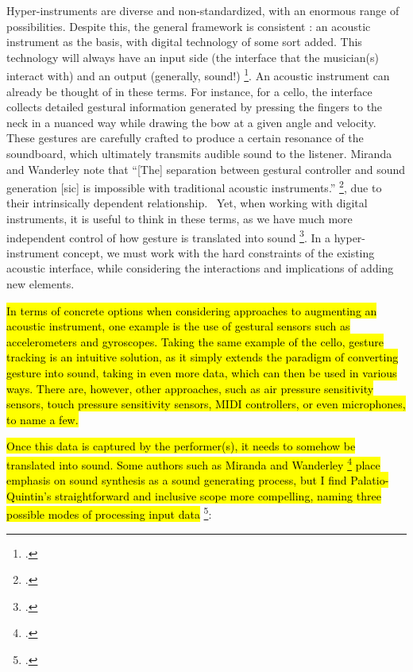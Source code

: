 \documentclass[12pt,twoside,maitrise]{dms_ks}
\theoremstyle{definition}
\begin{document}
Hyper-instruments are diverse and non-standardized, with an enormous range of possibilities.  
Despite this, the general framework is consistent : an acoustic instrument as the basis, with digital technology of some sort added. 
This technology will always have an input side (the interface that the musician(s) interact with) and an output (generally, sound!) \footcite[3]{miranda_new_2006}. 
An acoustic instrument can already be thought of in these terms.
For instance, for a cello, the interface collects detailed gestural information generated by pressing the fingers to the neck in a nuanced way while drawing the bow at a given angle and velocity. 
These gestures are carefully crafted to produce a certain resonance of the soundboard, which ultimately transmits audible sound to the listener. 
Miranda and Wanderley note that “[The] separation between gestural controller and sound generation [sic] is impossible with traditional acoustic instruments.” \footcite[3]{miranda_new_2006}, due to their intrinsically dependent relationship.~
Yet, when working with digital instruments, it is useful to think in these terms, as we have much more independent control of how gesture is translated into sound \footcite[24--25]{jorda_digital_2005}.
In a hyper-instrument concept, we must work with the hard constraints of the existing acoustic interface, while considering the interactions and implications of adding new elements. 

\hl{In terms of concrete options when considering approaches to augmenting an acoustic instrument, one example is the use of gestural sensors such as accelerometers and gyroscopes. 
Taking the same example of the cello, gesture tracking is an intuitive solution, as it simply extends the paradigm of converting gesture into sound, taking in even more data, which can then be used in various ways. 
There are, however, other approaches, such as air pressure sensitivity sensors, touch pressure sensitivity sensors, MIDI controllers, or even microphones, to name a few.} 


\hl{Once this data is captured by the performer(s), it needs to somehow be translated into sound. Some authors such as Miranda and Wanderley \footcite[3]{miranda_new_2006} place emphasis on sound synthesis as a sound generating process, but I find Palatio-Quintin's straightforward and inclusive scope more compelling, naming three possible modes of processing input data} \footcite[52]{palacio-quintin_composition_2012-1}:
\end{document}
